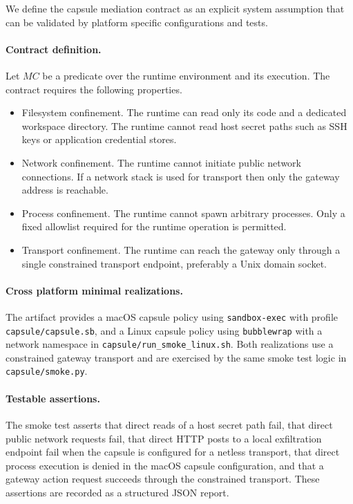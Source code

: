 We define the capsule mediation contract as an explicit system assumption that can be validated by
platform specific configurations and tests.

\paragraph{Contract definition.}
Let $MC$ be a predicate over the runtime environment and its execution.
The contract requires the following properties.

\begin{itemize}
\item Filesystem confinement. The runtime can read only its code and a dedicated workspace directory.
The runtime cannot read host secret paths such as SSH keys or application credential stores.
\item Network confinement. The runtime cannot initiate public network connections.
If a network stack is used for transport then only the gateway address is reachable.
\item Process confinement. The runtime cannot spawn arbitrary processes.
Only a fixed allowlist required for the runtime operation is permitted.
\item Transport confinement. The runtime can reach the gateway only through a single constrained
transport endpoint, preferably a Unix domain socket.
\end{itemize}

\paragraph{Cross platform minimal realizations.}
The artifact provides a macOS capsule policy using \texttt{sandbox-exec} with profile
\texttt{capsule/capsule.sb}, and a Linux capsule policy using \texttt{bubblewrap} with a network
namespace in \texttt{capsule/run\_smoke\_linux.sh}.
Both realizations use a constrained gateway transport and are exercised by the same smoke test logic
in \texttt{capsule/smoke.py}.

\paragraph{Testable assertions.}
The smoke test asserts that direct reads of a host secret path fail, that direct public network
requests fail, that direct HTTP posts to a local exfiltration endpoint fail when the capsule is
configured for a netless transport, that direct process execution is denied in the macOS capsule
configuration, and that a gateway action request succeeds through the constrained transport.
These assertions are recorded as a structured JSON report.

